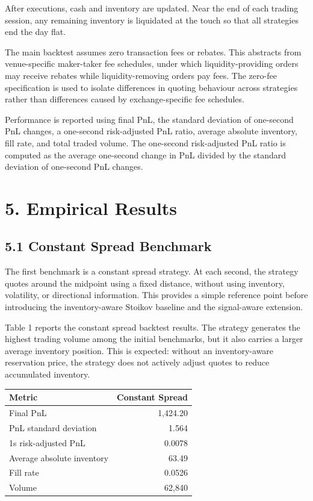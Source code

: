 \documentclass[12pt,a4paper]{article}
\let\originalsection\section
\renewcommand{\section}{\clearpage\originalsection}
\begin{document}
After executions, cash and inventory are updated. Near the end of each
trading session, any remaining inventory is liquidated at the touch so
that all strategies end the day flat.

The main backtest assumes zero transaction fees or rebates. This
abstracts from venue-specific maker-taker fee schedules, under which
liquidity-providing orders may receive rebates while liquidity-removing
orders pay fees. The zero-fee specification is used to isolate
differences in quoting behaviour across strategies rather than
differences caused by exchange-specific fee schedules.

Performance is reported using final PnL, the standard deviation of
one-second PnL changes, a one-second risk-adjusted PnL ratio, average
absolute inventory, fill rate, and total traded volume. The one-second
risk-adjusted PnL ratio is computed as the average one-second change in
PnL divided by the standard deviation of one-second PnL changes.

\section{5. Empirical Results}\label{empirical-results}

\subsection{5.1 Constant Spread
Benchmark}\label{constant-spread-benchmark-1}

The first benchmark is a constant spread strategy. At each second, the
strategy quotes around the midpoint using a fixed distance, without
using inventory, volatility, or directional information. This provides a
simple reference point before introducing the inventory-aware Stoikov
baseline and the signal-aware extension.

Table 1 reports the constant spread backtest results. The strategy
generates the highest trading volume among the initial benchmarks, but
it also carries a larger average inventory position. This is expected:
without an inventory-aware reservation price, the strategy does not
actively adjust quotes to reduce accumulated inventory.

\begingroup\small{}\setlength{\tabcolsep}{4pt}
\begin{longtable}[]{@{}lr@{}}
\toprule\noalign{}
Metric & Constant Spread \\
\midrule\noalign{}
\endhead
\bottomrule\noalign{}
\endlastfoot
Final PnL & 1,424.20 \\
PnL standard deviation & 1.564 \\
1s risk-adjusted PnL & 0.0078 \\
Average absolute inventory & 63.49 \\
Fill rate & 0.0526 \\
Volume & 62,840 \\
\end{longtable}
\endgroup
\end{document}
